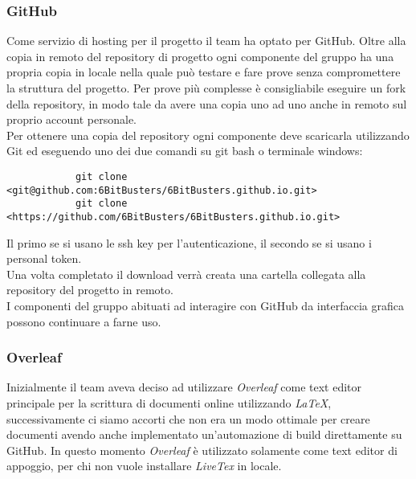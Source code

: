         \subsubsection{GitHub}
        Come servizio di hosting per il progetto il team ha optato per GitHub. 
        Oltre alla copia in remoto del repository di progetto ogni componente del gruppo ha una propria
        copia in locale nella quale può testare e fare prove senza compromettere la struttura del progetto.
        Per prove più complesse è consigliabile eseguire un fork della repository, in modo tale da avere una copia uno ad uno anche in 
        remoto sul proprio account personale.\\
        Per ottenere una copia del repository ogni componente deve scaricarla utilizzando Git ed eseguendo uno dei due comandi 
        su git bash o terminale windows:
        \begin{verbatim}
            git clone <git@github.com:6BitBusters/6BitBusters.github.io.git>
            git clone <https://github.com/6BitBusters/6BitBusters.github.io.git>
        \end{verbatim}
        Il primo se si usano le ssh key per l'autenticazione, il secondo se si usano i personal token.\\
        Una volta completato il download verrà creata una cartella collegata alla repository del progetto in remoto.\\
        I componenti del gruppo abituati ad interagire con GitHub da interfaccia grafica possono continuare a
        farne uso.
        
        \subsubsection{Overleaf}
        Inizialmente il team aveva deciso ad utilizzare \textit{Overleaf} come text editor principale per la scrittura di documenti online utilizzando \textit{LaTeX}, successivamente ci siamo accorti
        che non era un modo ottimale per creare documenti avendo anche implementato un'automazione di build direttamente su GitHub.
        In questo momento \textit{Overleaf} è utilizzato solamente come text editor di appoggio, per chi non vuole installare \textit{LiveTex} in locale.
        
        
